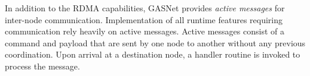 In addition to the RDMA capabilities, GASNet provides {\em active messages} for 
inter-node communication.  Implementation of all runtime features requiring communication
rely heavily on active messages.  Active messages consist of a command and payload that
are sent by one node to another without any previous coordination.  Upon arrival
at a destination node, a handler routine is invoked to process the message.



